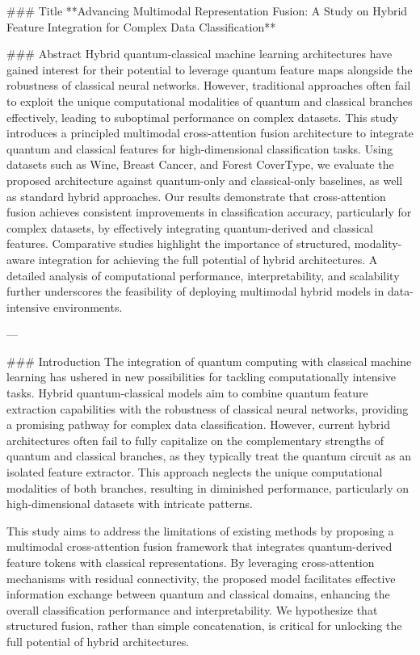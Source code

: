 ### Title
**Advancing Multimodal Representation Fusion: A Study on Hybrid Feature Integration for Complex Data Classification**

### Abstract
Hybrid quantum-classical machine learning architectures have gained interest for their potential to leverage quantum feature maps alongside the robustness of classical neural networks. However, traditional approaches often fail to exploit the unique computational modalities of quantum and classical branches effectively, leading to suboptimal performance on complex datasets. This study introduces a principled multimodal cross-attention fusion architecture to integrate quantum and classical features for high-dimensional classification tasks. Using datasets such as Wine, Breast Cancer, and Forest CoverType, we evaluate the proposed architecture against quantum-only and classical-only baselines, as well as standard hybrid approaches. Our results demonstrate that cross-attention fusion achieves consistent improvements in classification accuracy, particularly for complex datasets, by effectively integrating quantum-derived and classical features. Comparative studies highlight the importance of structured, modality-aware integration for achieving the full potential of hybrid architectures. A detailed analysis of computational performance, interpretability, and scalability further underscores the feasibility of deploying multimodal hybrid models in data-intensive environments.

---

### Introduction
The integration of quantum computing with classical machine learning has ushered in new possibilities for tackling computationally intensive tasks. Hybrid quantum-classical models aim to combine quantum feature extraction capabilities with the robustness of classical neural networks, providing a promising pathway for complex data classification. However, current hybrid architectures often fail to fully capitalize on the complementary strengths of quantum and classical branches, as they typically treat the quantum circuit as an isolated feature extractor. This approach neglects the unique computational modalities of both branches, resulting in diminished performance, particularly on high-dimensional datasets with intricate patterns.

This study aims to address the limitations of existing methods by proposing a multimodal cross-attention fusion framework that integrates quantum-derived feature tokens with classical representations. By leveraging cross-attention mechanisms with residual connectivity, the proposed model facilitates effective information exchange between quantum and classical domains, enhancing the overall classification performance and interpretability. We hypothesize that structured fusion, rather than simple concatenation, is critical for unlocking the full potential of hybrid architectures. 

